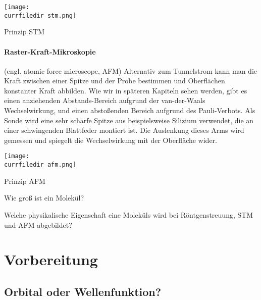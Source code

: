 \begin{marginfigure}
\texttt{[image: \\currfiledir stm.png]}
\caption{Prinzip STM}
\end{marginfigure}


\paragraph{Raster-Kraft-Mikroskopie} (engl. atomic force microscope, AFM) Alternativ zum Tunnelstrom kann man die Kraft zwischen einer Spitze und der Probe bestimmen und Oberflächen konstanter Kraft abbilden. Wie wir in späteren Kapiteln sehen werden, gibt es einen anziehenden Abstands-Bereich aufgrund der van-der-Waals Wechselwirkung, und einen abstoßenden Bereich aufgrund des Pauli-Verbots. Als Sonde wird eine sehr scharfe Spitze aus beispielsweise Silizium verwendet, die an einer schwingenden Blattfeder montiert ist. Die Auslenkung dieses Arms wird gemessen und spiegelt die Wechselwirkung mit der Oberfläche wider.


\begin{marginfigure}
\texttt{[image: \\currfiledir afm.png]}
\caption{Prinzip AFM}
\end{marginfigure}

 
\begin{questions} 
\item Wie groß ist ein Molekül?
\item Welche physikalische Eigenschaft eine Moleküls wird bei Röntgenstreuung, STM und AFM abgebildet?
\end{questions}
 
 
\section{Vorbereitung}


\subsection{Orbital oder Wellenfunktion?}

